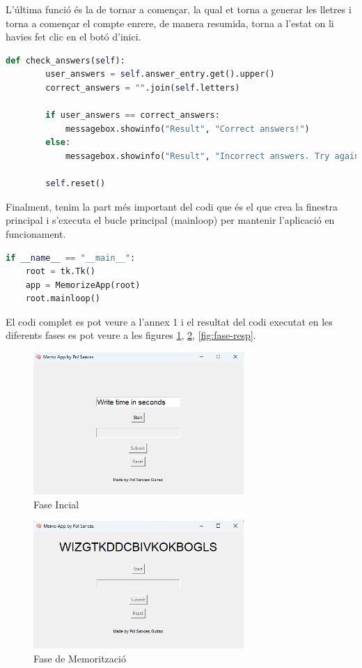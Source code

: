 L'última funció és la de tornar a començar, la qual et torna a generar les lletres i torna a
començar el compte enrere, de manera resumida, torna a l'estat on li havies fet clic en el botó
d'inici.   

\begin{lstlisting}[language=Python, style=colorEX, caption=Funció per tornar a començar]
    def check_answers(self):
        user_answers = self.answer_entry.get().upper()
        correct_answers = "".join(self.letters)

        if user_answers == correct_answers:
            messagebox.showinfo("Result", "Correct answers!")
        else:
            messagebox.showinfo("Result", "Incorrect answers. Try again.")

        self.reset()
\end{lstlisting}

Finalment, tenim la part més important del codi que és el que crea la finestra principal i s'executa el bucle principal (mainloop) per mantenir l'aplicació en funcionament.

\begin{lstlisting}[language=Python, style=colorEX, caption=Bucle per mantenir l'aplicació en funcionament]
if __name__ == "__main__":
    root = tk.Tk()
    app = MemorizeApp(root)
    root.mainloop()
\end{lstlisting}

El codi complet es pot veure a l'annex 1 i el resultat del codi executat en les diferents fases es pot veure a les figures \ref{fig:fase-incial}, \ref{fig:fase-memo}, \ref{fig:fase-resp}. \cite{Freecodecamp} \cite{Tkinter} \cite{LogoCervell} \cite{RecursosPython}

\begin{figure}[h!]
    \centering
    \includegraphics[width=8cm]{img/figures/app-fase1.png}
    \caption{Fase Incial}
    \label{fig:fase-incial}
\end{figure}

\begin{figure}[h!]
    \centering
    \includegraphics[width=8cm]{img/figures/app-fase2.png}
    \caption{Fase de Memorització}
    \label{fig:fase-memo}
\end{figure}

